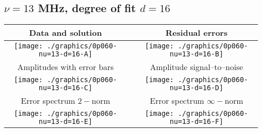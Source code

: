 

% 

\clearpage{}
\break{}

\subsection{$\nu = 13$ MHz, degree of fit $d = 16$}

\begin{table}[h]
    \begin{center}
        \begin{tabular}{ccc}
            Data and solution & \quad & Residual errors \\\hline
            \texttt{[image: ./graphics/0p060-nu=13-d=16-A]} &&
            \texttt{[image: ./graphics/0p060-nu=13-d=16-B]} \\[15pt]
            Amplitudes with error bars && Amplitude signal--to--noise \\\hline
            \texttt{[image: ./graphics/0p060-nu=13-d=16-C]} &&
            \texttt{[image: ./graphics/0p060-nu=13-d=16-D]} \\[15pt]
            Error spectrum $2-$norm && Error spectrum $\infty-$norm \\\hline
            \texttt{[image: ./graphics/0p060-nu=13-d=16-E]} &&
            \texttt{[image: ./graphics/0p060-nu=13-d=16-F]} \\[15pt]
        \end{tabular}
    \end{center}
\label{fig:elev=60, nu=13}
\end{table}



\endinput
